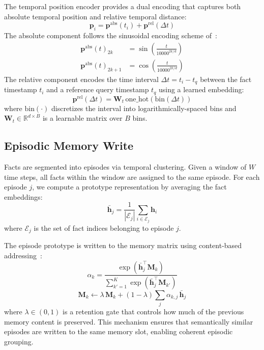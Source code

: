 \documentclass{article}
\begin{document}
The temporal position encoder provides a dual encoding that captures both absolute temporal position and relative temporal distance:
\begin{equation}
\mathbf{p}_i = \mathbf{p}^{\text{abs}}(t_i) + \mathbf{p}^{\text{rel}}(\Delta t)
\label{eq:temporal_encoding}
\end{equation}
The absolute component follows the sinusoidal encoding scheme of~\citet{vaswani2017attention}:
\begin{align}
\mathbf{p}^{\text{abs}}(t)_{2k} &= \sin\!\left(\frac{t}{10000^{2k/d}}\right) \\
\mathbf{p}^{\text{abs}}(t)_{2k+1} &= \cos\!\left(\frac{t}{10000^{2k/d}}\right)
\end{align}
The relative component encodes the time interval $\Delta t = t_i - t_q$ between the fact timestamp $t_i$ and a reference query timestamp $t_q$ using a learned embedding:
\begin{equation}
\mathbf{p}^{\text{rel}}(\Delta t) = \mathbf{W}_t \, \text{one\_hot}(\text{bin}(\Delta t))
\end{equation}
where $\text{bin}(\cdot)$ discretizes the interval into logarithmically-spaced bins and $\mathbf{W}_t \in \mathbb{R}^{d \times B}$ is a learnable matrix over $B$ bins.

\subsection{Episodic Memory Write}
\label{sec:method:write}

Facts are segmented into episodes via temporal clustering. Given a window of $W$ time steps, all facts within the window are assigned to the same episode. For each episode $j$, we compute a prototype representation by averaging the fact embeddings:
\begin{equation}
\bar{\mathbf{h}}_j = \frac{1}{|\mathcal{E}_j|} \sum_{i \in \mathcal{E}_j} \mathbf{h}_i
\end{equation}
where $\mathcal{E}_j$ is the set of fact indices belonging to episode $j$.

The episode prototype is written to the memory matrix using content-based addressing~\citep{graves2016dnc}:
\begin{equation}
\alpha_k = \frac{\exp(\bar{\mathbf{h}}_j^\top \mathbf{M}_k)}{\sum_{k'=1}^{K} \exp(\bar{\mathbf{h}}_j^\top \mathbf{M}_{k'})}
\end{equation}
\begin{equation}
\mathbf{M}_k \leftarrow \lambda \, \mathbf{M}_k + (1 - \lambda) \sum_j \alpha_{k,j} \, \bar{\mathbf{h}}_j
\label{eq:memory_write}
\end{equation}
where $\lambda \in (0, 1)$ is a retention gate that controls how much of the previous memory content is preserved. This mechanism ensures that semantically similar episodes are written to the same memory slot, enabling coherent episodic grouping.
\end{document}

